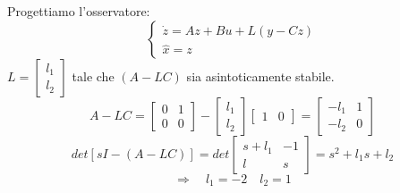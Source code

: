 \documentclass[../main.tex]{subfiles}
\begin{document}
\begin{Exercise}[title={Stabilizzazione di un sistema con osservatore}, difficulty=1]
			Progettiamo l'osservatore:
			\[
				\begin{cases}
					\dot z = Az + Bu +L(y-Cz)\\
					\hat x = z
				\end{cases}
			\]
			$ L = \left[  \begin{smallmatrix} l_1 \\ l_2 \end{smallmatrix} \right] $ tale che $ (A-LC) $ sia asintoticamente stabile.
			\[
				A-LC = 
				\begin{bmatrix}
					0 & 1\\
					0 & 0
				\end{bmatrix} -
				\begin{bmatrix}
					l_1\\
					l_2
				\end{bmatrix}
				\begin{bmatrix}
					1 & 0
				\end{bmatrix} = 
				\begin{bmatrix}
					-l_1 & 1\\
					-l_2 & 0
				\end{bmatrix}
			\]
			\[
				det\left[ sI - (A-LC) \right] = det 
				\begin{bmatrix}
					s+l_1 & -1\\
					l & s
				\end{bmatrix} = s^2 + l_1 s + l_2
			\]
			\[
				\Rightarrow\quad l_1 = -2 \quad l_2 = 1
			\]
		\end{Exercise}
\end{document}
